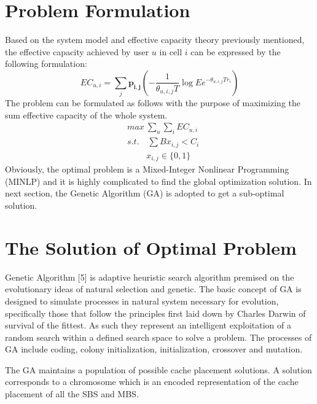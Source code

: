 \documentclass[conference]{IEEEtran}
\begin{document}
\section{Problem Formulation}
Based on the system model and effective capacity theory previously mentioned, the effective capacity achieved by user $u$ in cell $i$ can be expressed by the following formulation:
\begin{equation}
EC_{u,i}=\sum_j\mathbf{p_{i,j}}(-\frac{1}{\theta_{u,i,j}T}\log Ee^{-\theta_{u,i,j}Tr_i})
\end{equation}
The problem can be formulated as follows with the purpose of maximizing the sum effective capacity of the whole system.
\begin{equation}
 \begin{aligned}
   & {max}\ \sum_u\sum_iEC_{u,i}\\
   & s.t. \quad\sum Bx_{i,j}<C_i\\
   & \qquad \ x_{i,j}\in\{0,1\}
 \end{aligned}
\end{equation}
Obviously, the optimal problem is a Mixed-Integer Nonlinear Programming (MINLP) and it is highly complicated to find the global optimization solution. In next section, the Genetic Algorithm (GA) is adopted to get a sub-optimal solution.
\section{The Solution of Optimal Problem}
Genetic Algorithm [5] is adaptive heuristic search algorithm premised on the evolutionary ideas of natural selection and genetic. The basic concept of GA is designed to simulate processes in natural system necessary for evolution, specifically those that follow the principles first laid down by Charles Darwin of survival of the fittest. As such they represent an intelligent exploitation of a random search within a defined search space to solve a problem. The processes of GA include coding, colony initialization, initialization, crossover and mutation.

The GA maintains a population of possible cache placement solutions. A solution corresponds to a chromosome which is an encoded representation of the cache placement of all the SBS and MBS.
\end{document}
